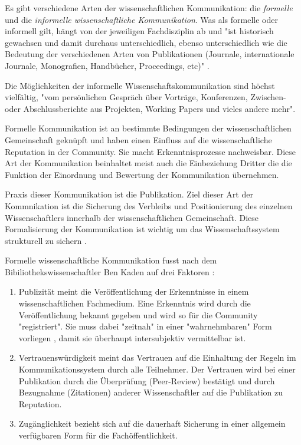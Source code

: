 Es gibt verschiedene Arten der wissenschaftlichen Kommunikation: die \textit{formelle} und die \textit{informelle wissenschaftliche Kommunikation}. Was als formelle oder informell gilt, hängt von der jeweiligen Fachdisziplin ab und "ist historisch gewachsen und damit durchaus unterschiedlich, ebenso unterschiedlich wie die Bedeutung der verschiedenen Arten von Publikationen (Journale, internationale Journale, Monografien, Handbücher, Proceedings, etc)" \cite{Hanekop_2014}.

Die Möglichkeiten der informelle Wissenschaftskommunikation sind höchst vielfältig, "vom persönlichen Gespräch über Vorträge, Konferenzen, Zwischen- oder Abschlussberichte aus Projekten, Working Papers und vieles andere mehr"\cite{Hanekop_2014}.

Formelle Kommunikation ist an bestimmte Bedingungen der wissenschaftlichen Gemeinschaft geknüpft und haben einen Einfluss auf die wissenschaftliche Reputation in der Community. Sie macht Erkenntnisprozesse nachweisbar\cite{kaden_2009_library}. Diese Art der Kommunikation beinhaltet meist auch die Einbeziehung Dritter die die Funktion der Einordnung und Bewertung der Kommunikation übernehmen.

Praxis dieser Kommunikation ist die Publikation. Ziel dieser Art der Kommnikation ist die Sicherung des Verbleibs und Positionierung des einzelnen Wissenschaftlers innerhalb der wissenschaftlichen Gemeinschaft. Diese Formalisierung der Kommunikation ist wichtig um das Wissenschaftssystem strukturell zu sichern \cite{kaden_2009_library}.

Formelle wissenschaftliche Kommunikation fusst nach dem Bibiliothekswissenschaftler Ben Kaden auf drei Faktoren \cite{kaden_2009_library}:
\begin{enumerate}
\item Publizität meint die Veröffentlichung der Erkenntnisse in einem wissenschaftlichen Fachmedium. Eine Erkenntnis wird durch die Veröffentlichung bekannt gegeben und wird so für die Community "registriert".  Sie muss dabei "zeitnah" in einer "wahrnehmbaren" Form vorliegen \cite{Schimank_2012}, damit sie überhaupt intersubjektiv vermittelbar ist.
\item Vertrauenswürdigkeit meint das Vertrauen auf die Einhaltung der Regeln im Kommunikationssystem durch alle Teilnehmer. Der Vertrauen wird bei einer Publikation durch die Überprüfung (Peer-Review) bestätigt und durch Bezugnahme (Zitationen) anderer Wissenschaftler auf die Publikation zu Reputation.
\item Zugänglichkeit bezieht sich auf die dauerhaft Sicherung in einer allgemein verfügbaren Form für die Fachöffentlichkeit.
\end{enumerate}

